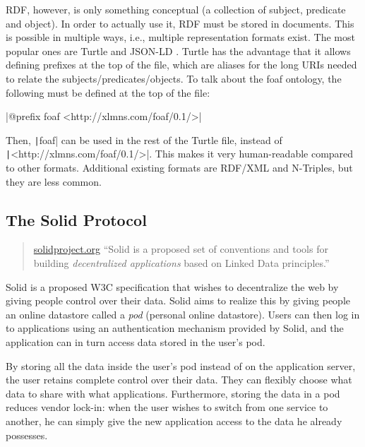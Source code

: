 \gls{RDF}, however, is only something conceptual (a collection of subject, predicate and object). In order to actually use it, \gls{RDF} must be stored in documents. This is possible in multiple ways, i.e., multiple representation formats exist. The most popular ones are Turtle \citep{turtle} and JSON-LD \citep{jsonld}. Turtle has the advantage that it allows defining prefixes at the top of the file, which are aliases for the long URIs needed to relate the subjects/predicates/objects. To talk about the foaf ontology, the following must be defined at the top of the file:

|@prefix foaf <http://xlmns.com/foaf/0.1/>|

\noindent Then, \texttt|foaf| can be used in the rest of the Turtle file, instead of\\ \texttt|<http://xlmns.com/foaf/0.1/>|. This makes it very human-readable compared to other formats. Additional existing formats are \gls{RDF}/XML and N-Triples, but they are less common.

\subsection{The Solid Protocol}
\label{sec:solid-protocol}
\begin{quote}{\href{https://solidproject.org}{solidproject.org}}
    ``Solid is a proposed set of conventions and tools for building \textit{decentralized applications} based on Linked Data principles.''
\end{quote}

\noindent Solid \citep{solid} is a proposed W3C specification that wishes to decentralize the web by giving people control over their data. Solid aims to realize this by giving people an online datastore called a \textit{pod} (personal online datastore). Users can then log in to applications using an authentication mechanism provided by Solid, and the application can in turn access data stored in the user's pod.

By storing all the data inside the user's pod instead of on the application server, the user retains complete control over their data. They can flexibly choose what data to share with what applications. Furthermore, storing the data in a pod reduces vendor lock-in: when the user wishes to switch from one service to another, he can simply give the new application access to the data he already possesses. 

